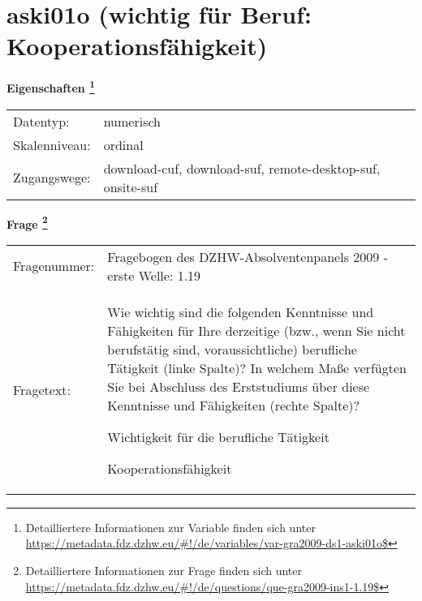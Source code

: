 
    \setcounter{footnote}{0}

    \vspace*{-1.8cm}
	\section{aski01o (wichtig für Beruf: Kooperationsfähigkeit)}
	\label{section:aski01o}



    \vspace*{0.5cm}
    \noindent\textbf{Eigenschaften
	\footnote{Detailliertere Informationen zur Variable finden sich unter
		\url{https://metadata.fdz.dzhw.eu/\#!/de/variables/var-gra2009-ds1-aski01o$}}}\\
	\begin{tabularx}{\hsize}{@{}lX}
	Datentyp: & numerisch \\
	Skalenniveau: & ordinal \\
	Zugangswege: &
	  download-cuf, 
	  download-suf, 
	  remote-desktop-suf, 
	  onsite-suf
 \\
    \end{tabularx}



				\vspace*{0.5cm}
                \noindent\textbf{Frage
	                \footnote{Detailliertere Informationen zur Frage finden sich unter
		              \url{https://metadata.fdz.dzhw.eu/\#!/de/questions/que-gra2009-ins1-1.19$}}}\\
				\begin{tabularx}{\hsize}{@{}lX}
					Fragenummer: &
					  Fragebogen des DZHW-Absolventenpanels 2009 - erste Welle:
					  1.19
 \\
					Fragetext: & Wie wichtig sind die folgenden Kenntnisse und Fähigkeiten für Ihre derzeitige (bzw., wenn Sie nicht berufstätig sind, voraussichtliche) berufliche Tätigkeit (linke Spalte)? In welchem Maße verfügten Sie bei Abschluss des Erststudiums über diese Kenntnisse und Fähigkeiten (rechte Spalte)?\par  Wichtigkeit für die berufliche Tätigkeit\par  Kooperationsfähigkeit \\
				\end{tabularx}





